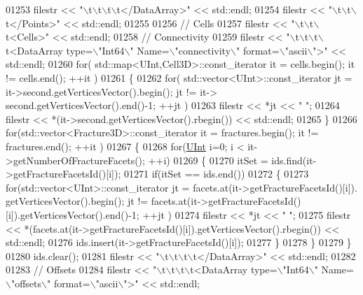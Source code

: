 \begin{DoxyCode}
01253     filestr << \textcolor{stringliteral}{"\(\backslash\)t\(\backslash\)t\(\backslash\)t\(\backslash\)t</DataArray>"} << std::endl;
01254     filestr << \textcolor{stringliteral}{"\(\backslash\)t\(\backslash\)t\(\backslash\)t</Points>"} << std::endl;
01255 
01256     \textcolor{comment}{// Cells}
01257     filestr << \textcolor{stringliteral}{"\(\backslash\)t\(\backslash\)t\(\backslash\)t<Cells>"} << std::endl;
01258     \textcolor{comment}{//  Connectivity}
01259     filestr << \textcolor{stringliteral}{"\(\backslash\)t\(\backslash\)t\(\backslash\)t\(\backslash\)t<DataArray type=\(\backslash\)"Int64\(\backslash\)" Name=\(\backslash\)"connectivity\(\backslash\)" format=\(\backslash\)"ascii\(\backslash\)">"} << std::endl;
01260     \textcolor{keywordflow}{for}( std::map<UInt,Cell3D>::const\_iterator it = cells.begin(); it != cells.end(); ++it )
01261     \{
01262         \textcolor{keywordflow}{for}( std::vector<UInt>::const\_iterator jt = it->second.getVerticesVector().begin(); jt != it->
      second.getVerticesVector().end()-1; ++jt )
01263             filestr << *jt << \textcolor{stringliteral}{" "};
01264         filestr << *(it->second.getVerticesVector().rbegin()) << std::endl;
01265     \}
01266     \textcolor{keywordflow}{for}(std::vector<Fracture3D>::const\_iterator it = fractures.begin(); it != fractures.end(); ++it )
01267     \{
01268         \textcolor{keywordflow}{for}(\hyperlink{namespaceFVCode3D_a4bf7e328c75d0fd504050d040ebe9eda}{UInt} i=0; i < it->getNumberOfFractureFacets(); ++i)
01269         \{
01270             itSet = ids.find(it->getFractureFacetsId()[i]);
01271             \textcolor{keywordflow}{if}(itSet == ids.end())
01272             \{
01273                 \textcolor{keywordflow}{for}(std::vector<UInt>::const\_iterator jt = facets.at(it->getFractureFacetsId()[i]).
      getVerticesVector().begin(); jt != facets.at(it->getFractureFacetsId()[i]).getVerticesVector().end()-1; ++jt )
01274                     filestr << *jt << \textcolor{stringliteral}{" "};
01275                 filestr << *(facets.at(it->getFractureFacetsId()[i]).getVerticesVector().rbegin()) << 
      std::endl;
01276                 ids.insert(it->getFractureFacetsId()[i]);
01277             \}
01278         \}
01279     \}
01280     ids.clear();
01281     filestr << \textcolor{stringliteral}{"\(\backslash\)t\(\backslash\)t\(\backslash\)t\(\backslash\)t</DataArray>"} << std::endl;
01282 
01283     \textcolor{comment}{//  Offsets}
01284     filestr << \textcolor{stringliteral}{"\(\backslash\)t\(\backslash\)t\(\backslash\)t\(\backslash\)t<DataArray type=\(\backslash\)"Int64\(\backslash\)" Name=\(\backslash\)"offsets\(\backslash\)" format=\(\backslash\)"ascii\(\backslash\)">"} << std::endl;

\end{DoxyCode}
